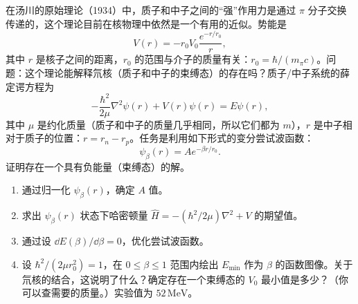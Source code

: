 \begin{question}
在汤川的原始理论（1934）中，质子和中子之间的“强”作用力是通过 $\pi$ 分子交换传递的，这个理论目前在核物理中依然是一个有用的近似。势能是
\[
V(r)=-r_0V_0\frac{e^{-r/r_0}}{r},
\]
其中 $r$ 是核子之间的距离，$r_0$ 的范围与介子的质量有关：$r_0=\hbar/(m_\pi c)$。问题：这个理论能解释氘核（质子和中子的束缚态）的存在吗？质子/中子系统的薛定谔方程为
\[
-\frac{\hbar^2}{2\mu}\nabla^2\psi(r)+V(r)\psi(r)=E\psi(r),
\]
其中 $\mu$ 是约化质量（质子和中子的质量几乎相同，所以它们都为 $m$），$r$ 是中子相对于质子的位置：$r=r_n-r_p$。任务是利用如下形式的变分尝试波函数：
\[
\psi_\beta(r)=Ae^{-\beta r/r_0}.
\]
证明存在一个具有负能量（束缚态）的解。
\begin{enumerate}
\item 通过归一化 $\psi_\beta(r)$，确定 $A$ 值。
\item 求出 $\psi_\beta(r)$ 状态下哈密顿量 $\hat H=-(\hbar^2/2\mu)\nabla^2+V$ 的期望值。
\item 通过设 $\dd E(\beta)/\dd\beta=0$，优化尝试波函数。
\item 设 $\hbar^2/(2\mu r_0^2)=1$，在 $0\le\beta\le1$ 范围内绘出 $E_{\min}$ 作为 $\beta$ 的函数图像。关于氘核的结合，这说明了什么？确定存在一个束缚态的 $V_0$ 最小值是多少？（你可以查需要的质量。）实验值为 $52\,\mathrm{MeV}$。
\end{enumerate}
\end{question}

